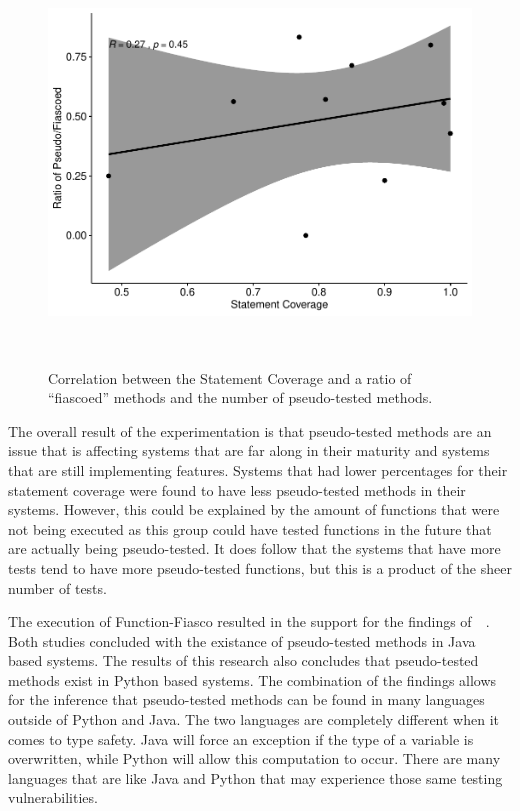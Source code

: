 

\begin{figure}[H]
  \centering
  \includegraphics[scale = .5]{images/stateCovPlot}
  \caption{Correlation between the Statement Coverage and a ratio of ``fiascoed'' methods and the number of pseudo-tested methods.}~\label{stateCovReg}
\end{figure}


The overall result of the experimentation is that pseudo-tested methods are an issue that is affecting systems that are far along in their maturity and systems that are still implementing features. Systems that had lower percentages for their statement coverage were found to have less pseudo-tested methods in their systems. However, this could be explained by the amount of functions that were not being executed as this group could have tested functions in the future that are actually being pseudo-tested. It does follow that the systems that have more tests tend to have more pseudo-tested functions, but this is a product of the sheer number of tests.

The execution of Function-Fiasco resulted in the support for the findings of~\cite{niedermayr2016will}~\cite{vera2017comprehensive}. Both studies concluded with the existance of pseudo-tested methods in Java based systems. The results of this research also concludes that pseudo-tested methods exist in Python based systems. The combination of the findings allows for the inference that pseudo-tested methods can be found in many languages outside of Python and Java. The two languages are completely different when it comes to type safety. Java will force an exception if the type of a variable is overwritten, while Python will allow this computation to occur. There are many languages that are like Java and Python that may experience those same testing vulnerabilities.

